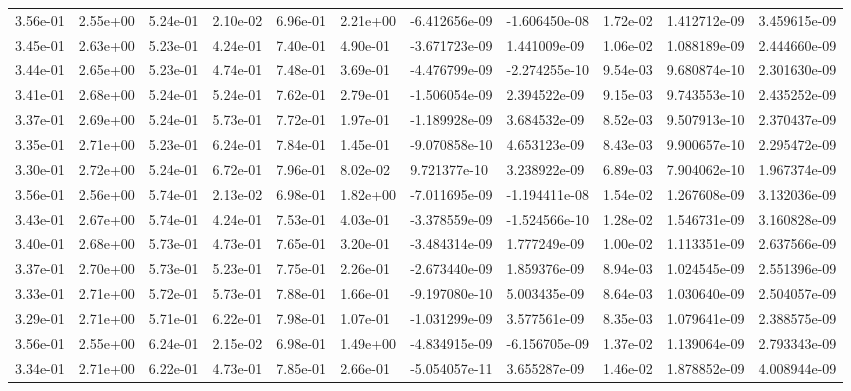 \begin{longtable}{| p{} | p{} |}
3.56e-01 & 2.55e+00 & 5.24e-01 & 2.10e-02 & 6.96e-01 & 2.21e+00 & -6.412656e-09 & -1.606450e-08 &  1.72e-02 &  1.412712e-09 &  3.459615e-09 \\
3.45e-01 & 2.63e+00 & 5.23e-01 & 4.24e-01 & 7.40e-01 & 4.90e-01 & -3.671723e-09 &  1.441009e-09 &  1.06e-02 &  1.088189e-09 &  2.444660e-09 \\
3.44e-01 & 2.65e+00 & 5.23e-01 & 4.74e-01 & 7.48e-01 & 3.69e-01 & -4.476799e-09 & -2.274255e-10 &  9.54e-03 &  9.680874e-10 &  2.301630e-09 \\
3.41e-01 & 2.68e+00 & 5.24e-01 & 5.24e-01 & 7.62e-01 & 2.79e-01 & -1.506054e-09 &  2.394522e-09 &  9.15e-03 &  9.743553e-10 &  2.435252e-09 \\
3.37e-01 & 2.69e+00 & 5.24e-01 & 5.73e-01 & 7.72e-01 & 1.97e-01 & -1.189928e-09 &  3.684532e-09 &  8.52e-03 &  9.507913e-10 &  2.370437e-09 \\
3.35e-01 & 2.71e+00 & 5.23e-01 & 6.24e-01 & 7.84e-01 & 1.45e-01 & -9.070858e-10 &  4.653123e-09 &  8.43e-03 &  9.900657e-10 &  2.295472e-09 \\
3.30e-01 & 2.72e+00 & 5.24e-01 & 6.72e-01 & 7.96e-01 & 8.02e-02 &  9.721377e-10 &  3.238922e-09 &  6.89e-03 &  7.904062e-10 &  1.967374e-09 \\
3.56e-01 & 2.56e+00 & 5.74e-01 & 2.13e-02 & 6.98e-01 & 1.82e+00 & -7.011695e-09 & -1.194411e-08 &  1.54e-02 &  1.267608e-09 &  3.132036e-09 \\
3.43e-01 & 2.67e+00 & 5.74e-01 & 4.24e-01 & 7.53e-01 & 4.03e-01 & -3.378559e-09 & -1.524566e-10 &  1.28e-02 &  1.546731e-09 &  3.160828e-09 \\
3.40e-01 & 2.68e+00 & 5.73e-01 & 4.73e-01 & 7.65e-01 & 3.20e-01 & -3.484314e-09 &  1.777249e-09 &  1.00e-02 &  1.113351e-09 &  2.637566e-09 \\
3.37e-01 & 2.70e+00 & 5.73e-01 & 5.23e-01 & 7.75e-01 & 2.26e-01 & -2.673440e-09 &  1.859376e-09 &  8.94e-03 &  1.024545e-09 &  2.551396e-09 \\
3.33e-01 & 2.71e+00 & 5.72e-01 & 5.73e-01 & 7.88e-01 & 1.66e-01 & -9.197080e-10 &  5.003435e-09 &  8.64e-03 &  1.030640e-09 &  2.504057e-09 \\
3.29e-01 & 2.71e+00 & 5.71e-01 & 6.22e-01 & 7.98e-01 & 1.07e-01 & -1.031299e-09 &  3.577561e-09 &  8.35e-03 &  1.079641e-09 &  2.388575e-09 \\
3.56e-01 & 2.55e+00 & 6.24e-01 & 2.15e-02 & 6.98e-01 & 1.49e+00 & -4.834915e-09 & -6.156705e-09 &  1.37e-02 &  1.139064e-09 &  2.793343e-09 \\
3.34e-01 & 2.71e+00 & 6.22e-01 & 4.73e-01 & 7.85e-01 & 2.66e-01 & -5.054057e-11 &  3.655287e-09 &  1.46e-02 &  1.878852e-09 &  4.008944e-09 \\

\end{longtable}
